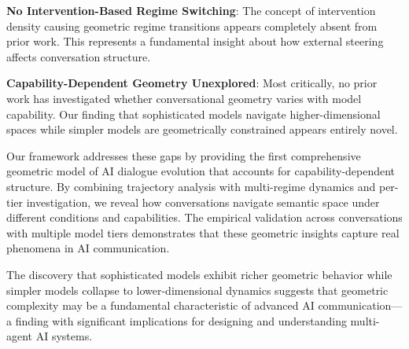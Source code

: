 \documentclass[11pt,letterpaper]{article}
\begin{document}
\textbf{No Intervention-Based Regime Switching}: The concept of intervention density causing geometric regime transitions appears completely absent from prior work. This represents a fundamental insight about how external steering affects conversation structure.

\textbf{Capability-Dependent Geometry Unexplored}: Most critically, no prior work has investigated whether conversational geometry varies with model capability. Our finding that sophisticated models navigate higher-dimensional spaces while simpler models are geometrically constrained appears entirely novel.

Our framework addresses these gaps by providing the first comprehensive geometric model of AI dialogue evolution that accounts for capability-dependent structure. By combining trajectory analysis with multi-regime dynamics and per-tier investigation, we reveal how conversations navigate semantic space under different conditions and capabilities. The empirical validation across \totalConversations{} conversations with multiple model tiers demonstrates that these geometric insights capture real phenomena in AI communication.

The discovery that sophisticated models exhibit richer geometric behavior while simpler models collapse to lower-dimensional dynamics suggests that geometric complexity may be a fundamental characteristic of advanced AI communication—a finding with significant implications for designing and understanding multi-agent AI systems.



\end{document}

